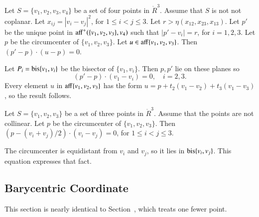 \begin{tarskidata}
\begin{tarski}
\begin{lemma}
Let $S=\{v_1,v_2,v_3,v_4\}$ be a set of four points
in $\ring{R}^3$.  Assume that $S$ is not not coplanar.
Let $x_{ij} = |v_i-v_j|^2$, for $1\le i < j\le 3$.
Let $r > \eta(x_{12},x_{23},x_{13})$.
Let $p'$ be the unique point in
${\operatorname{aff}}^+(\{v_1,v_2,v_3\},v_4)$
such that
   $|p'-v_i| = r$, for $i=1,2,3$.
Let $p$ be the circumcenter of $\{v_1,v_2,v_3\}$.  Let 
$u\in {\operatorname{aff}}\{v_1,v_2,v_3\}$.  Then
  $(p'-p)\cdot (u-p)=0$.
\end{lemma}

\begin{proved}  Let $P_i={\operatorname{bis}}\{v_1,v_i\}$ 
be the bisector
of $\{v_1,v_i\}$.  Then $p,p'$ lie on these planes so
  $$(p'-p)\cdot (v_1-v_i)=0,\quad i=2,3.$$
Every element $u$ in ${\operatorname{aff}}\{v_1,v_2,v_3\}$
has the form $u=p + t_2(v_1-v_2) + t_3(v_1-v_3)$, so the result
follows.
\swallowed\end{proved}
\end{tarski}





\begin{tarski}

\begin{lemma}
Let $S=\{v_1,v_2,v_3\}$ be a set of three points
in $\ring{R}^3$.  Assume that the points are not collinear.
Let $p$ be the circumcenter of $\{v_1,v_2,v_3\}$.   Then
  $(p-(v_i+v_j)/2)\cdot (v_i-v_j)=0$, for $1\le i<j\le 3$.
\end{lemma}

\begin{proved}  The circumcenter is equidistant from $v_i$
and $v_j$, so it lies in ${\operatorname{bis}}\{v_i,v_j\}$.
This equation expresses that fact.
\swallowed\end{proved}
\end{tarski}





\begin{tarski}
\section{Barycentric Coordinate}
This section is nearly identical to Section~, which treats one fewer point.


\end{tarski}
\end{tarskidata}
